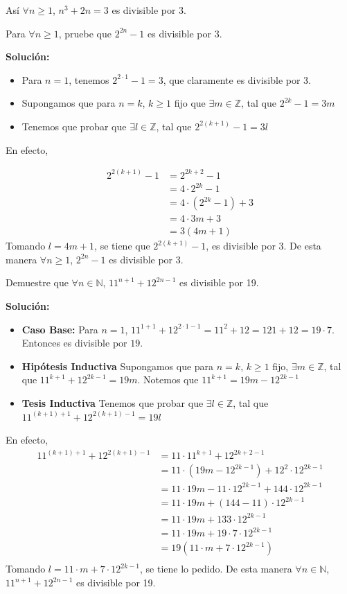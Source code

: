 \documentclass[12pt]{book}
\begin{document}
Así $\forall n \geq 1$, $n^3+2n=3$ es divisible por 3.

\begin{prob}{}{}
    Para $\forall n \geq1$, pruebe que $2^{2n}-1$ es divisible por 3.
\end{prob}
\textbf{Solución:} 
\begin{itemize}
    \item Para $n=1$, tenemos $2^{2\cdot 1}-1=3$, que claramente es divisible por 3.

    \item Supongamos que para $n=k$, $k\geq 1$ fijo que $\exists m \in \mathbb{Z}$, tal que $2^{2k}-1 = 3m$

    \item Tenemos que probar que $\exists l \in \mathbb{Z}$, tal que $2^{2(k+1)}-1=3l$
\end{itemize}
En efecto,

\begin{align*}
    2^{2(k+1)}-1&=2^{2k+2}-1 \\
    &=4\cdot 2^{2k}-1 \\
    &=4\cdot( 2^{2k}-1) +3 \\
    &=  4\cdot 3m+3 \\
    &=3(4m+1)
\end{align*}
Tomando $l=4m+1$, se tiene que $ 2^{2(k+1)}-1$, es divisible por 3. De esta manera 
$\forall n \geq1$, $2^{2n}-1$ es divisible por 3.

\begin{prob}{}{}
Demuestre que $\forall n \in \mathbb{N}$, $11^{n+1}+12^{2n-1}$ es divisible por 19.
\end{prob}
\textbf{Solución:}
\begin{itemize}
    \item \textbf{Caso Base:} Para $n=1$, $11^{1+1}+12^{2\cdot1-1}=11^2+12=121+12=19 \cdot 7$. Entonces es divisible por $19$.

    \item \textbf{Hipótesis Inductiva} Supongamos que para $n=k$, $k\geq 1$ fijo, $\exists m \in \mathbb{Z}$, tal que $11^{k+1}+12^{2k-1}=19m$. Notemos que $11^{k+1}=19m-12^{2k-1} $

    \item \textbf{Tesis Inductiva} Tenemos que probar que $\exists l \in \mathbb{Z}$, tal que $11^{(k+1)+1}+12^{2(k+1)-1}=19l$
\end{itemize}
En efecto,
\begin{align*}
    11^{(k+1)+1}+12^{2(k+1)-1}&=11\cdot 11^{k+1}+12^{2k+2-1} \\
    &=11 \cdot(19m-12^{2k-1})+12^2 \cdot 12^{2k-1} \\
    &= 11 \cdot 19m-11 \cdot 12^{2k-1}+144 \cdot 12^{2k-1} \\
    &=11\cdot 19m+(144-11)\cdot 12^{2k-1} \\
    &=11\cdot 19m+133\cdot 12^{2k-1} \\
 &=11\cdot 19m+19\cdot7\cdot 12^{2k-1} \\
    &= 19(11\cdot m+7\cdot 12^{2k-1}) \\
\end{align*}
Tomando $l=11\cdot m+7\cdot 12^{2k-1}$, se tiene lo pedido. De esta manera $\forall n \in \mathbb{N}$, $11^{n+1}+12^{2n-1}$ es divisible por 19.
\end{document}

